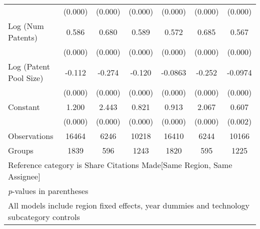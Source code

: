 \begin{table}[htbp]
\begin{adjustbox}{angle=90}
\begin{tabular}{l*{6}{c}}
                &  (0.000)&  (0.000)&  (0.000)&  (0.000)&  (0.000)&  (0.000)\\
Log (Num Patents)&    0.586&    0.680&    0.589&    0.572&    0.685&    0.567\\
                &  (0.000)&  (0.000)&  (0.000)&  (0.000)&  (0.000)&  (0.000)\\
Log (Patent Pool Size)&   -0.112&   -0.274&   -0.120&  -0.0863&   -0.252&  -0.0974\\
                &  (0.000)&  (0.000)&  (0.000)&  (0.000)&  (0.000)&  (0.000)\\
Constant        &    1.200&    2.443&    0.821&    0.913&    2.067&    0.607\\
                &  (0.000)&  (0.000)&  (0.000)&  (0.000)&  (0.000)&  (0.002)\\
\hline
Observations    &    16464&     6246&    10218&    16410&     6244&    10166\\
Groups          &     1839&      596&     1243&     1820&      595&     1225\\
\hline\hline
\multicolumn{7}{l}{\footnotesize Reference category is Share Citations Made[Same Region, Same Assignee]}\\
\multicolumn{7}{l}{\footnotesize \textit{p}-values in parentheses}\\
\multicolumn{7}{l}{\footnotesize All models include region fixed effects, year dummies and technology subcategory controls}\\
\end{tabular}
\end{adjustbox}
\end{table}
